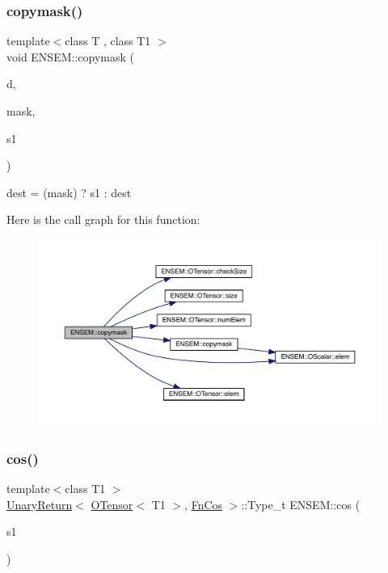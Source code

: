 \subsubsection{\texorpdfstring{copymask()}{copymask()}}
{\footnotesize\ttfamily template$<$class T , class T1 $>$ \\
void E\+N\+S\+E\+M\+::copymask (\begin{DoxyParamCaption}\item[{\mbox{\hyperlink{classENSEM_1_1OTensor}{O\+Tensor}}$<$ T $>$ \&}]{d,  }\item[{const \mbox{\hyperlink{classENSEM_1_1OScalar}{O\+Scalar}}$<$ T1 $>$ \&}]{mask,  }\item[{const \mbox{\hyperlink{classENSEM_1_1OTensor}{O\+Tensor}}$<$ T $>$ \&}]{s1 }\end{DoxyParamCaption})\hspace{0.3cm}{\ttfamily [inline]}}



dest = (mask) ? s1 \+: dest 

Here is the call graph for this function\+:\nopagebreak
\begin{figure}[H]
\begin{center}
\leavevmode
\includegraphics[width=350pt]{de/d87/group__obstensor_gaec447bbfae019c25fe1906a76108bff8_cgraph}
\end{center}
\end{figure}
\mbox{\label{group__obstensor_gab6c0f7f88211609a81b1ab43c346d285}} 
\subsubsection{\texorpdfstring{cos()}{cos()}}
{\footnotesize\ttfamily template$<$class T1 $>$ \\
\mbox{\hyperlink{structENSEM_1_1UnaryReturn}{Unary\+Return}}$<$ \mbox{\hyperlink{classENSEM_1_1OTensor}{O\+Tensor}}$<$ T1 $>$, \mbox{\hyperlink{structENSEM_1_1FnCos}{Fn\+Cos}} $>$\+::Type\+\_\+t E\+N\+S\+E\+M\+::cos (\begin{DoxyParamCaption}\item[{const \mbox{\hyperlink{classENSEM_1_1OTensor}{O\+Tensor}}$<$ T1 $>$ \&}]{s1 }\end{DoxyParamCaption})\hspace{0.3cm}{\ttfamily [inline]}}

